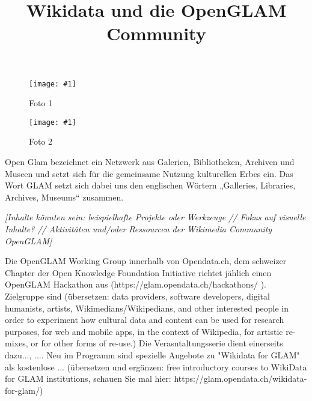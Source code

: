 \documentclass{article}
\newlength{\imgwidth}
\newcommand\scaledgraphics[2]{%
                
\settowidth{\imgwidth}{\texttt{[image: \#1]}}%
                
\setlength{\imgwidth}{\minof{\imgwidth}{#2\textwidth}}%
                
\texttt{[image: \#1]}%
                
}
\begin{document}
\title{Wikidata und die OpenGLAM Community}

\maketitle




\begin{wrapfigure}{l}{0.5\textwidth}
\scaledgraphics{ea614bab-3f4c-4c33-9fda-586c650b58c5.png}{0.5}
\caption*{Foto 1}\label{F76287561}
\end{wrapfigure}

\begin{wrapfigure}{r}{0.5\textwidth}
\scaledgraphics{ce15208f-6cbe-4d4f-a6eb-ffd2e7f8fb24.png}{0.5}
\caption*{Foto 2}\label{F81154591}
\end{wrapfigure}




















Open Glam bezeichnet ein Netzwerk aus Galerien, Bibliotheken, Archiven und Museen und setzt sich für die gemeinsame Nutzung kulturellen Erbes ein. Das Wort GLAM setzt sich dabei uns den englischen Wörtern „Galleries, Libraries, Archives, Museums“ zusammen. \autocite{FidusWriter}


\emph{[Inhalte könnten sein: beispielhafte Projekte oder Werkzeuge // Fokus auf visuelle Inhalte? // Aktivitäten und/oder Ressourcen der Wikimedia Community OpenGLAM]}


Die OpenGLAM Working Group innerhalb von Opendata.ch, dem schweizer Chapter der Open Knowledge Foundation Initiative richtet jählich einen OpenGLAM Hackathon aus (https://glam.opendata.ch/hackathons/ ). Zielgruppe sind (übersetzen: data providers, software developers, digital humanists, artists, Wikimedians/Wikipedians, and other interested people in order to experiment how cultural data and content can be used for research purposes, for web and mobile apps, in the context of Wikipedia, for artistic re-mixes, or for other forms of re-use.)  Die Verasntaltungsserie dient einerseits dazu..., .... Neu im Programm sind spezielle Angebote zu "Wikidata for GLAM" als kostenlose ... (übersetzen und ergänzen: free introductory courses to WikiData for GLAM institutions, schauen Sie mal hier: https://glam.opendata.ch/wikidata-for-glam/)
\end{document}
